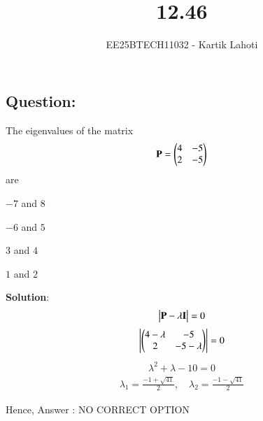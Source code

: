 \documentclass[journal]{IEEEtran}
\numberwithin{equation}{enumi}
\numberwithin{figure}{enumi}
\begin{document}

\vspace{3cm}

\title{12.46}
\author{EE25BTECH11032 - Kartik Lahoti}
\maketitle

\subsection*{Question: } 
The eigenvalues of the matrix
\begin{align}
    \mathbf{P} = \begin{pmatrix}4 & -5 \\ 2 & -5\end{pmatrix}
\end{align}
are 
\begin{enumerate}
    \begin{multicols}{2}
        \item $-7$ and $8$
        \item $-6$ and $5$
        \item $3$ and $4$
        \item $1$ and $2$
    \end{multicols}
\end{enumerate}

\textbf{Solution}:\\

\begin{align}
    \begin{vmatrix}\mathbf{P} - \lambda\mathbf{I}\end{vmatrix} = 0
\end{align}
\begin{align}
    \begin{vmatrix}\begin{pmatrix}4-\lambda & -5 \\ 2 & -5-\lambda\end{pmatrix}\end{vmatrix} = 0 
\end{align}
\begin{align}
    \lambda^2 + \lambda -10 = 0
\end{align}
\begin{align}
    \lambda_1 = \frac{-1+\sqrt{41}}{2}, \quad 
    \lambda_2 = \frac{-1-\sqrt{41}}{2}
\end{align}

Hence, Answer : NO CORRECT OPTION
\end{document}
